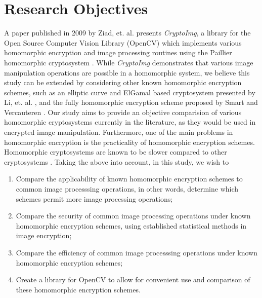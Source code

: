 \section{Research Objectives}

A paper published in 2009 by Ziad, et. al. presents \textit{CryptoImg}, a library for the  Open Source Computer Vision Library (OpenCV) \cite{bradski_opencv_2000} which implements various homomorphic encryption and image processing routines using the Paillier homomorphic cryptosystem \cite{ziad_cryptoimg:_2016}. While \textit{CryptoImg} demonstrates that various image manipulation operations are possible in a homomorphic system, we believe this study can be extended by considering other known homomorphic encryption schemes, such as an elliptic curve and ElGamal based cryptosystem presented by Li, et. al. \cite{li_elliptic_2012}, and the fully homomorphic encryption scheme proposed by Smart and Vercauteren \cite{hutchison_fully_2010}. Our study aims to provide an objective comparision of various homomorphic cryptosystems currently in the literature, as they would be used in encrypted image manipulation.
Furthermore, one of the main problems in homomorphic encryption is the practicality of homomorphic encryption schemes. Homomorphic cryptosystems are known to be slower compared to other cryptosystems \cite{sen_homomorphic_2013}.
Taking the above into account, in this study, we wish to
\begin{enumerate}
    \item Compare the applicability of known homomorphic encryption schemes to common image processsing operations, in other words, determine which schemes permit more image processing operations;
		\item Compare the security of common image processing operations under known homomorphic encryption schemes, using established statistical methods in image encryption;
    \item Compare the efficiency of common image processsing operations under known homomorphic encryption schemes;
    \item Create a library for OpenCV to allow for convenient use and comparison of these homomorphic encryption schemes.
\end{enumerate}

